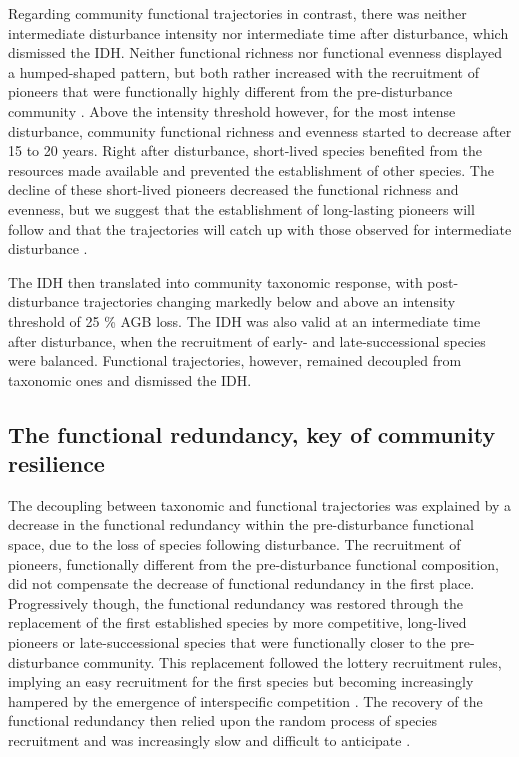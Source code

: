 \documentclass[fleqn,10pt]{ArtEcoFoG} %
\begin{document}
Regarding community functional trajectories in contrast, there was
neither intermediate disturbance intensity nor intermediate time after
disturbance, which dismissed the IDH. Neither functional richness nor
functional evenness displayed a humped-shaped pattern, but both rather
increased with the recruitment of pioneers that were functionally highly
different from the pre-disturbance community
\citep{Denslow1980, Molino2001}. Above the intensity threshold however,
for the most intense disturbance, community functional richness and
evenness started to decrease after 15 to 20 years. Right after
disturbance, short-lived species benefited from the resources made
available and prevented the establishment of other species. The decline
of these short-lived pioneers decreased the functional richness and
evenness, but we suggest that the establishment of long-lasting pioneers
will follow and that the trajectories will catch up with those observed
for intermediate disturbance \citep{Walker2009}.

The IDH then translated into community taxonomic response, with
post-disturbance trajectories changing markedly below and above an
intensity threshold of 25 \% AGB loss. The IDH was also valid at an
intermediate time after disturbance, when the recruitment of early- and
late-successional species were balanced. Functional trajectories,
however, remained decoupled from taxonomic ones and dismissed the IDH.

\subsection{The functional redundancy, key of community
resilience}\label{the-functional-redundancy-key-of-community-resilience}

The decoupling between taxonomic and functional trajectories was
explained by a decrease in the functional redundancy within the
pre-disturbance functional space, due to the loss of species following
disturbance. The recruitment of pioneers, functionally different from
the pre-disturbance functional composition, did not compensate the
decrease of functional redundancy in the first place. Progressively
though, the functional redundancy was restored through the replacement
of the first established species by more competitive, long-lived
pioneers or late-successional species that were functionally closer to
the pre-disturbance community. This replacement followed the lottery
recruitment rules, implying an easy recruitment for the first species
but becoming increasingly hampered by the emergence of interspecific
competition \citep{Busing2002}. The recovery of the functional
redundancy then relied upon the random process of species recruitment
and was increasingly slow and difficult to anticipate
\citep{Elmqvist2003, Diaz2005}.
\end{document}
